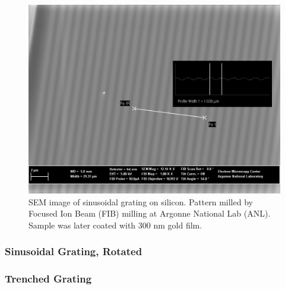\begin{figure}
  \centering
  \includegraphics{HighMagSEM.jpg}
  \caption{
    SEM image of sinusoidal grating on silicon.
    Pattern milled by Focused Ion Beam (FIB) milling at Argonne National Lab (ANL).
    Sample was later coated with 300 nm gold film.
  }
  \label{fig:fib-si-sem}
\end{figure}

\subsubsection{Sinusoidal Grating, Rotated}

\subsubsection{Trenched Grating}
